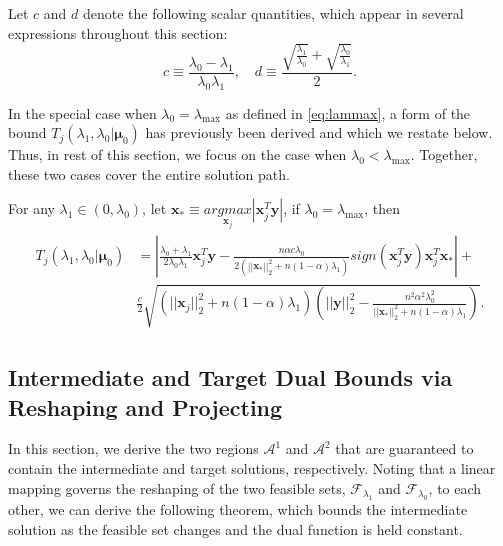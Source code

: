 Let $c$ and $d$ denote the following scalar quantities, which appear in several expressions throughout this section:
\begin{equation}
    c\equiv\frac{\lambda_0-\lambda_1}{\lambda_0\lambda_1},\quad d\equiv \frac{\sqrt{\frac{\lambda_1}{\lambda_0}}+\sqrt{\frac{\lambda_0}{\lambda_1}}}{2}.
\end{equation}

In the special case when $\lambda_0=\lambda_{\max}$ as defined in \eqref{eq:lammax}, a form of the bound $T_j(\lambda_{1},\lambda_{0}|\boldsymbol\mu_0)$ has previously been derived \citep{Zeng2021} and which we restate below. Thus, in rest of this section, we focus on the case when $\lambda_0<\lambda_{\max}$. Together, these two cases cover the entire solution path.

\begin{theorem}
    \label{thm:0.1}
    For any $\lambda_1\in(0,\lambda_{0})$, let $\boldsymbol x_*\equiv\underset{\boldsymbol x_j}{argmax}|\boldsymbol x_j^T\boldsymbol y|$, if $\lambda_0=\lambda_{\max}$, then
    \begin{gather}
        \begin{aligned}
            T_j(\lambda_{1},\lambda_{0}|\boldsymbol\mu_0)&=\left|\frac{\lambda_{0}+\lambda_1}{2\lambda_{0}\lambda_1}\boldsymbol x_j^T\boldsymbol y-\frac{n\alpha c\lambda_{0}}{2(||\boldsymbol x_*||_2^2+n(1-\alpha)\lambda_1)}\textit{sign}(\boldsymbol x_j^T\boldsymbol y) \boldsymbol x_j^T\boldsymbol x_*\right|+\\
            &\frac{c}{2}\sqrt{\left(||\boldsymbol x_j||_2^2+n(1-\alpha)\lambda_1\right)\left(||\boldsymbol y||_2^2-\frac{n^2\alpha^2\lambda_{0}^2}{||\boldsymbol x_*||_2^2+n(1-\alpha)\lambda_1}\right)}.
        \end{aligned}
    \end{gather}
\end{theorem}

\subsection{Intermediate and Target Dual Bounds via Reshaping and Projecting}
\label{sec:bounds}

In this section, we derive the two regions $\mathcal{A}^1$ and $\mathcal{A}^2$ that are guaranteed to contain the intermediate and target solutions, respectively. Noting that a linear mapping governs the reshaping of the two feasible sets, $\mathcal{F}_{\lambda_1}$ and $\mathcal{F}_{\lambda_0}$, to each other, we can derive the following theorem, which bounds the intermediate solution as the feasible set changes and the dual function is held constant.

